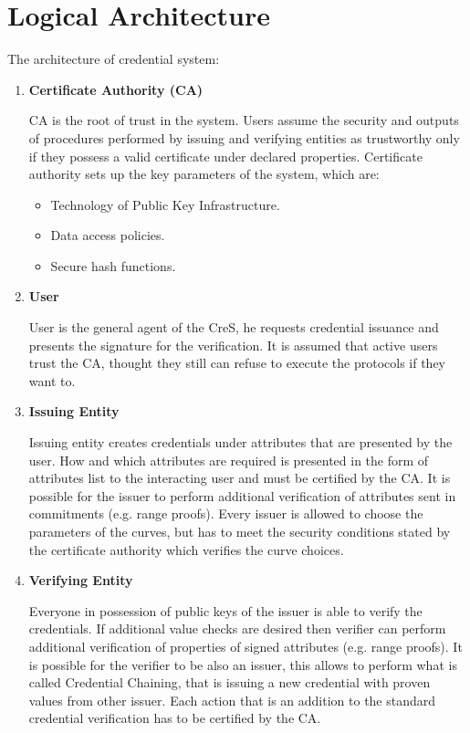 \section{Logical Architecture}
The architecture of credential system:
\begin{enumerate}
    \item \textbf{Certificate Authority (CA)}
    
    CA is the root of trust in the system. Users assume the security and outputs of procedures performed by issuing and verifying entities as trustworthy only if they possess a valid certificate under declared properties. Certificate authority sets up the key parameters of the system, which are:
    \begin{itemize}[label=$\circ$]
        \item Technology of Public Key Infrastructure.
        \item Data access policies.
        \item Secure hash functions. 
    \end{itemize}
    
    \item \textbf{User}
    
    User is the general agent of the CreS, he requests credential issuance and presents the signature for the verification. It is assumed that active users trust the CA, thought they still can refuse to execute the protocols if they want to.
    
    \item \textbf{Issuing Entity}
    
    Issuing entity creates credentials under attributes that are presented by the user. How and which attributes are required is presented in the form of attributes list to the interacting user and must be certified by the CA. It is possible for the issuer to perform additional verification of attributes sent in commitments (e.g. range proofs). Every issuer is allowed to choose the parameters of the curves, but has to meet the security conditions stated by the certificate authority which verifies the curve choices.
    
    \item \textbf{Verifying Entity}
    
    Everyone in possession of public keys of the issuer is able to verify the credentials. If additional value checks are desired then verifier can perform additional verification of properties of signed attributes (e.g. range proofs). It is possible for the verifier to be also an issuer, this allows to perform what is called Credential Chaining, that is issuing a new credential with proven values from other issuer. Each action that is an addition to the standard credential verification has to be certified by the CA. 
\end{enumerate}


